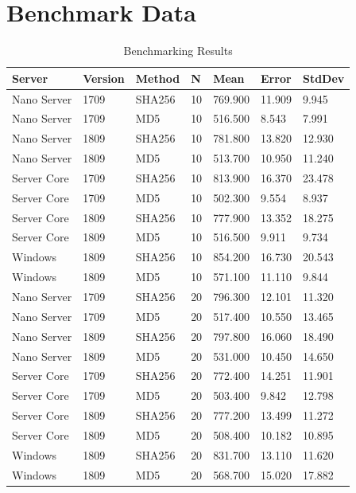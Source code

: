 \label{benchmarkdata}
\section{Benchmark Data}
\begin{table}[h]
	\centering
	\begin{tabular}{ll|l|l|l|l|l}
		Server      & Version & Method & N  & Mean    & Error  & StdDev \\ \hline
		Nano Server & 1709    & SHA256 & 10 & 769.900 & 11.909 & 9.945  \\
		Nano Server & 1709    & MD5    & 10 & 516.500 & 8.543  & 7.991  \\
		Nano Server & 1809    & SHA256 & 10 & 781.800 & 13.820 & 12.930 \\
		Nano Server & 1809    & MD5    & 10 & 513.700 & 10.950 & 11.240 \\
		Server Core & 1709    & SHA256 & 10 & 813.900 & 16.370 & 23.478 \\
		Server Core & 1709    & MD5    & 10 & 502.300 & 9.554  & 8.937  \\
		Server Core & 1809    & SHA256 & 10 & 777.900 & 13.352 & 18.275 \\
		Server Core & 1809    & MD5    & 10 & 516.500 & 9.911  & 9.734  \\
		Windows     & 1809    & SHA256 & 10 & 854.200 & 16.730 & 20.543 \\
		Windows     & 1809    & MD5    & 10 & 571.100 & 11.110 & 9.844  \\
		Nano Server & 1709    & SHA256 & 20 & 796.300 & 12.101 & 11.320 \\
		Nano Server & 1709    & MD5    & 20 & 517.400 & 10.550 & 13.465 \\
		Nano Server & 1809    & SHA256 & 20 & 797.800 & 16.060 & 18.490 \\
		Nano Server & 1809    & MD5    & 20 & 531.000 & 10.450 & 14.650 \\
		Server Core & 1709    & SHA256 & 20 & 772.400 & 14.251 & 11.901 \\
		Server Core & 1709    & MD5    & 20 & 503.400 & 9.842  & 12.798 \\
		Server Core & 1809    & SHA256 & 20 & 777.200 & 13.499 & 11.272 \\
		Server Core & 1809    & MD5    & 20 & 508.400 & 10.182 & 10.895 \\
		Windows     & 1809    & SHA256 & 20 & 831.700 & 13.110 & 11.620 \\
		Windows     & 1809    & MD5    & 20 & 568.700 & 15.020 & 17.882
	\end{tabular}
	\label{BenchmarkData}
	\caption{Benchmarking Results}
\end{table}
